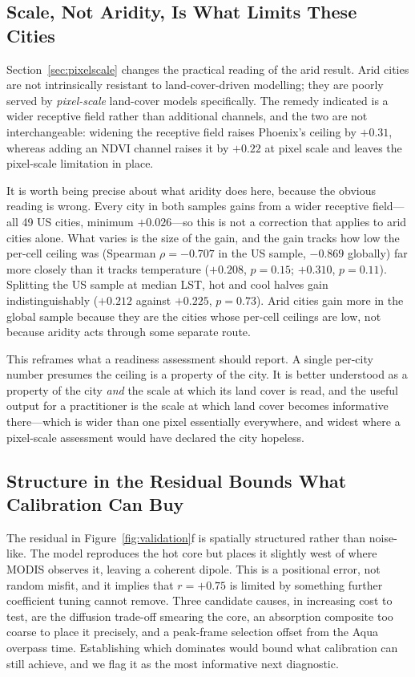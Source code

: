 \documentclass[remotesensing,article,submit,oneauthor]{Definitions/mdpi}
\begin{document}
\subsection{Scale, Not Aridity, Is What Limits These Cities}

Section~\ref{sec:pixelscale} changes the practical reading of the arid
result. Arid cities are not intrinsically resistant to land-cover-driven
modelling; they are poorly served by \emph{pixel-scale} land-cover models
specifically. The remedy indicated is a wider receptive field rather than
additional channels, and the two are not interchangeable: widening the
receptive field raises Phoenix's ceiling by $+0.31$, whereas adding an
NDVI channel raises it by $+0.22$ at pixel scale and leaves the
pixel-scale limitation in place.

It is worth being precise about what aridity does here, because the
obvious reading is wrong. Every city in both samples gains from a wider
receptive field---all 49 US cities, minimum $+0.026$---so this is not a
correction that applies to arid cities alone. What varies is the size of
the gain, and the gain tracks how low the per-cell ceiling was (Spearman
$\rho = -0.707$ in the US sample, $-0.869$ globally) far more closely than
it tracks temperature ($+0.208$, $p = 0.15$; $+0.310$, $p = 0.11$).
Splitting the US sample at median LST, hot and cool halves gain
indistinguishably ($+0.212$ against $+0.225$, $p = 0.73$). Arid cities
gain more in the global sample because they are the cities whose per-cell
ceilings are low, not because aridity acts through some separate route.

This reframes what a readiness assessment should report. A single
per-city number presumes the ceiling is a property of the city. It is
better understood as a property of the city \emph{and} the scale at which
its land cover is read, and the useful output for a practitioner is the
scale at which land cover becomes informative there---which is wider than
one pixel essentially everywhere, and widest where a pixel-scale
assessment would have declared the city hopeless.

\subsection{Structure in the Residual Bounds What Calibration Can Buy}

The residual in Figure~\ref{fig:validation}f is spatially structured
rather than noise-like. The model reproduces the hot core but places it
slightly west of where MODIS observes it, leaving a coherent dipole. This
is a positional error, not random misfit, and it implies that
$r = +0.75$ is limited by something further coefficient tuning cannot
remove. Three candidate causes, in increasing cost to test, are the
diffusion trade-off smearing the core, an absorption composite too coarse
to place it precisely, and a peak-frame selection offset from the Aqua
overpass time. Establishing which dominates would bound what calibration
can still achieve, and we flag it as the most informative next diagnostic.
\end{document}
